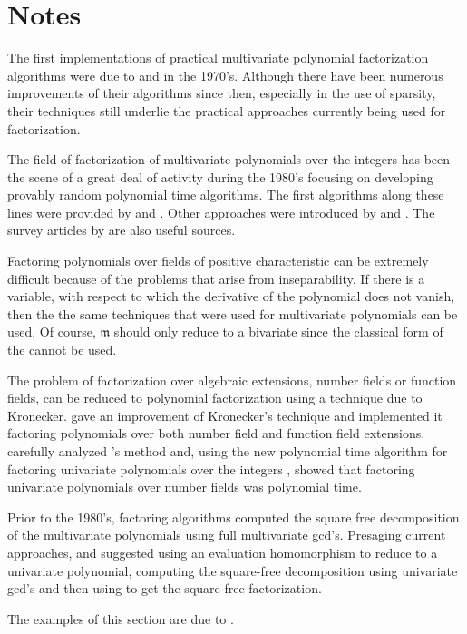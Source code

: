 \section*{Notes}

\small

The first implementations of practical multivariate polynomial
factorization algorithms were due to {\WangP} and {\Rothschild}
\cite{Wang1975-dj,Wang1976-yw,Wang1978-iu} in the 1970's.  Although there have been
numerous improvements of their algorithms since then, especially in
the use of sparsity, their techniques still underlie the practical
approaches currently being used for factorization.

The field of factorization of multivariate polynomials over the
integers has been the scene of a great deal of activity during the
1980's focusing on developing provably random polynomial time
algorithms.  The first algorithms along these lines were provided by
{\Chistov} and {\Grigoriev} \cite{Chistov1982-xt,Chistov1987-wq}.  Other
approaches were introduced by {\Gathen} and {\Kaltofen}
\cite{Gathen83b,Gathen85a,Kaltofen85b,Kaltofen85a,Kaltofen85e,Kaltofen90a}. 
The survey articles by {\Kaltofen}
\cite{Kaltofen82c,Kaltofen90b,Kaltofen92a} are also useful
sources. 

Factoring polynomials over fields of positive characteristic can be
extremely difficult because of the problems that arise from
inseparability.  If there is a variable, with respect to which the
derivative of the polynomial does not vanish, then the the same
techniques that were used for multivariate polynomials can be used.
Of course, $\mathfrak{m}$ should only reduce to a bivariate since the
classical form of the  cannot be
used. 

The problem of factorization over algebraic extensions, number fields
or function fields, can be reduced to polynomial factorization using a
technique due to Kronecker.  {\Trager} \cite{Trager1976-wn} gave an
improvement of Kronecker's technique and implemented it factoring
polynomials over both number field and function field extensions.
{\LandauS} \cite{Landau1985-ov} carefully analyzed {\Trager}'s method and,
using the new polynomial time algorithm for factoring univariate
polynomials over the integers \cite{Lenstra1982-gx}, showed that
factoring univariate polynomials over number fields was polynomial
time.

Prior to the 1980's, factoring algorithms computed the square free
decomposition of the multivariate polynomials using full multivariate
{\sc gcd}'s.  Presaging current approaches, {\Trager} and {\WangP}
\cite{Wang1979-ga} suggested using an evaluation homomorphism to reduce
to a univariate polynomial, computing the square-free decomposition
using univariate {\sc gcd}'s and then using  to
get the square-free factorization.

  The examples of this section are due
to {\Gathen} \cite{Gathen84,Gathen85a}.


\normalsize
